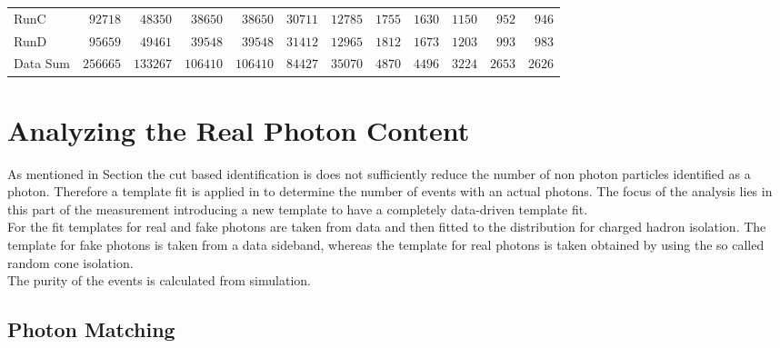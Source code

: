 \begin{landscape}
\begin{table}
\begin{tabular}{l | r r r r r r r r r r r }
             RunC &$             92718 $&$             48350 $&$             38650 $&$             38650 $&$             30711 $&$             12785 $&$              1755 $&$              1630 $&$              1150 $&$               952 $&$               946 $ \\

             RunD &$             95659 $&$             49461 $&$             39548 $&$             39548 $&$             31412 $&$             12965 $&$              1812 $&$              1673 $&$              1203 $&$               993 $&$               983 $ \\

\hline

         Data Sum &$            256665 $&$            133267 $&$            106410 $&$            106410 $&$             84427 $&$             35070 $&$              4870 $&$              4496 $&$              3224 $&$              2653 $&$              2626 $ \\

\hline

\end{tabular}
\label{tab_ttg_sel_evt}
\end{table}
\end{landscape}

\section{Analyzing the Real Photon Content}

As mentioned in Section  the cut based identification is does not sufficiently reduce the number of non photon particles identified as a photon. Therefore a template fit is applied in to determine the number of events with an actual photons. The focus of the analysis lies in this part of the measurement introducing a new template to have a completely data-driven template fit.\\
For the fit templates for real and fake photons are taken from data and then fitted to the distribution for charged hadron isolation. The template for fake photons is taken from a data sideband, whereas the template for real photons is taken obtained by using the so called random cone isolation.\\
The purity of the \ttgamma events is calculated from simulation.\\

\subsection{Photon Matching}

